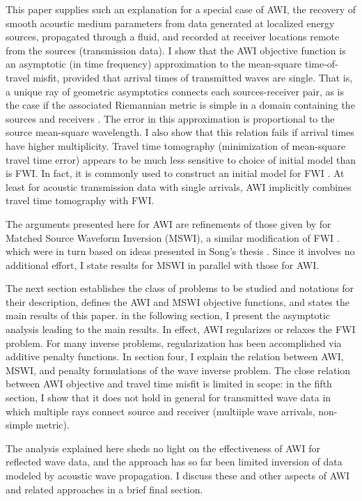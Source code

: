 This paper supplies such an explanation for a special case of AWI, the
recovery of smooth acoustic medium parameters from data generated at
localized energy sources, propagated through a fluid, and recorded at
receiver locations remote from the sources (transmission data). I show that the AWI
objective function is an asymptotic (in time frequency) approximation
to the mean-square time-of-travel misfit, provided that arrival times
of transmitted waves are single. That is, a unique ray of geometric
asymptotics connects each sources-receiver pair, as is the case if the associated
Riemannian metric is simple in a domain containing the sources and
receivers \cite[]{PestovUhlmann:05,StefanovUhlmann:05}. The error in
this approximation is proportional to the source mean-square
wavelength. I also show that this relation fails if arrival times have
higher multiplicity. Travel time tomography (minimization of
mean-square travel time error) appears to be much less sensitive to
choice of initial model than is FWI. In fact, it is commonly used to
construct an initial model for FWI
\cite[]{Bordingetal:87,SirguePratt:04,VirieuxOperto:09}. At least for
acoustic transmission data with single arrivals, AWI implicitly
combines travel time tomography with FWI.

The arguments presented here for AWI are refinements of those given by
\cite{HuangSymes:Geo17} for Matched Source Waveform Inversion (MSWI),
a similar modification of FWI
\cite[]{HuangSymes2015SEG,HuangSymes:Geo17}. which were in turn based
on ideas presented in Song's thesis \cite[]{Song:94c}. Since it
involves no additional effort, I state results for MSWI in parallel
with those for AWI.

The next section establishes the class of problems to be studied and notations
for their description, defines the AWI and MSWI objective functions,
and states the main results of this paper. in the following section, I present the
asymptotic analysis leading to the main results. In
effect, AWI regularizes or relaxes the FWI problem. For many inverse
problems, regularization has been accomplished via additive penalty
functions. In section four, I explain the relation between AWI, MSWI, and 
penalty formulations of the wave inverse problem. The close relation
between AWI objective and travel time misfit is limited in scope: in
the fifth section, I show that it does not hold in general for
transmitted wave data in which multiple rays connect source and
receiver (multiiple wave arrivals, non-simple metric).

The analysis explained here sheds no light on the effectiveness of AWI
for reflected wave data, and the approach has so far been limited
inversion of data modeled by acoustic wave propagation. I discuss
these and other aspects of AWI and related approaches in a brief final
section.

